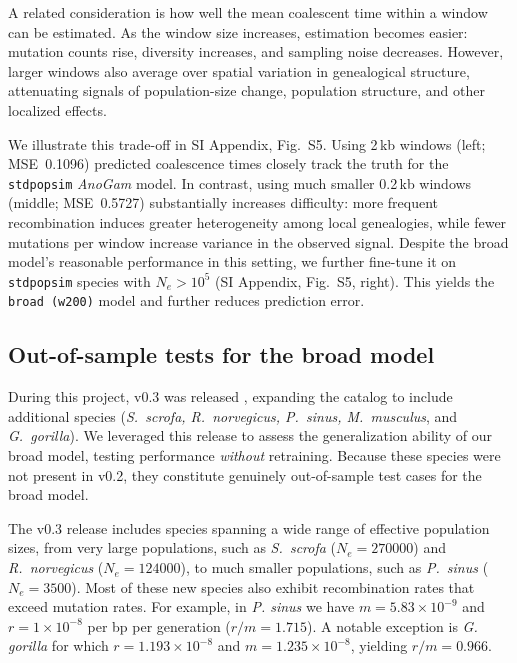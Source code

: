 \documentclass[9pt,twocolumn,twoside]{pnas-new}
\begin{document}
A related consideration is how well the mean coalescent time within a window can be estimated. 
As the window size increases, estimation becomes easier: mutation counts rise, diversity increases, and sampling noise decreases.
However, larger windows also average over spatial variation in genealogical structure, attenuating signals of population-size change, population structure, and other localized effects.

We illustrate this trade-off in SI Appendix, Fig.~S5. 
Using 2\,kb windows (left; MSE~0.1096) predicted coalescence times closely track the truth for the \texttt{stdpopsim} \textit{AnoGam} model.
In contrast, using much smaller 0.2\,kb windows (middle; MSE~0.5727) substantially increases difficulty:
more frequent recombination induces greater heterogeneity among local genealogies,
while fewer mutations per window increase variance in the observed signal. 
Despite the broad model's reasonable performance in this setting, 
we further fine-tune it on \texttt{stdpopsim} species with $N_e > 10^5$ (SI Appendix, Fig.~S5, right).
This yields the \texttt{broad~(w200)} model and further reduces prediction error.




\subsection*{Out-of-sample tests for the broad model}
During this project, \stdpopsim v0.3 was released \cite{gower2023expanding}, expanding the catalog to include additional species 
(\textit{S.~scrofa, R.~norvegicus, P.~sinus, M.~musculus}, and \textit{G.~gorilla}). 
We leveraged this release to assess the generalization ability of our broad model, testing performance \emph{without} retraining. 
Because these species were not present in \stdpopsim v0.2, they constitute genuinely out-of-sample test cases for the broad model.

The v0.3 release includes species spanning a wide range of effective population sizes, from very large populations, 
such as \emph{S.~scrofa} ($N_e = 270000$) and \emph{R.~norvegicus} ($N_e = 124000$), 
to much smaller populations, such as \emph{P.~sinus} ($N_e = 3500$). 
Most of these new species also exhibit recombination rates that exceed mutation rates.
For example, in  \emph{P. sinus} we have $m=5.83\times10^{-9}$ and $r=1\times10^{-8}$ per bp per generation ($r/m=1.715$).
A notable exception is \emph{G. gorilla} for which $r=1.193\times10^{-8}$ and $m=1.235\times10^{-8}$, yielding $r/m=0.966$.
\end{document}
